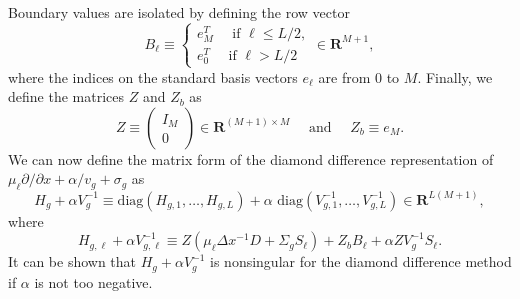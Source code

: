 Boundary values are isolated by defining the row vector
\begin{equation*}
	B_{\ell} \equiv \begin{cases}
				e_{M}^{T} \quad \text{ if } \ell \leq L/2, \\
				e_{0}^{T} \quad \text{ if } \ell > L/2
                              \end{cases} \in \mathbf{R}^{M+1},
\end{equation*}
where the indices on the standard basis vectors $e_{\ell}$ are from 0 to $M$. Finally, we define the matrices $Z$ and $Z_{b}$ as
\begin{equation*}
	Z \equiv \begin{pmatrix}
			I_{M} \\
			0
		     \end{pmatrix} \in \mathbf{R}^{(M+1) \times M} \quad \text{ and } \quad
	Z_{b} \equiv  e_{M}.
\end{equation*}
We can now define the matrix form of the diamond difference representation of  $\mu_{\ell} \partial/\partial x + \alpha/v_{g} + \sigma_{g}$ as 
\begin{equation*}
	H_{g} + \alpha V^{-1}_{g} \equiv \text{diag}(H_{g,1}, \dots, H_{g,L}) + \alpha \text{ diag}(V^{-1}_{g,1}, \dots, V^{-1}_{g,L}) \in \mathbf{R}^{L(M+1)},
\end{equation*}
where
\begin{equation*}
	H_{g,\ell} + \alpha V^{-1}_{g,\ell} \equiv Z(\mu_{\ell}\Delta x^{-1}D + \Sigma_{g}S_{\ell}) + Z_{b}B_{\ell} + \alpha ZV_{g}^{-1}S_{\ell}.
\end{equation*}
It can be shown that $H_{g} + \alpha V^{-1}_{g}$ is nonsingular for the diamond difference method if $\alpha$ is not too negative.

